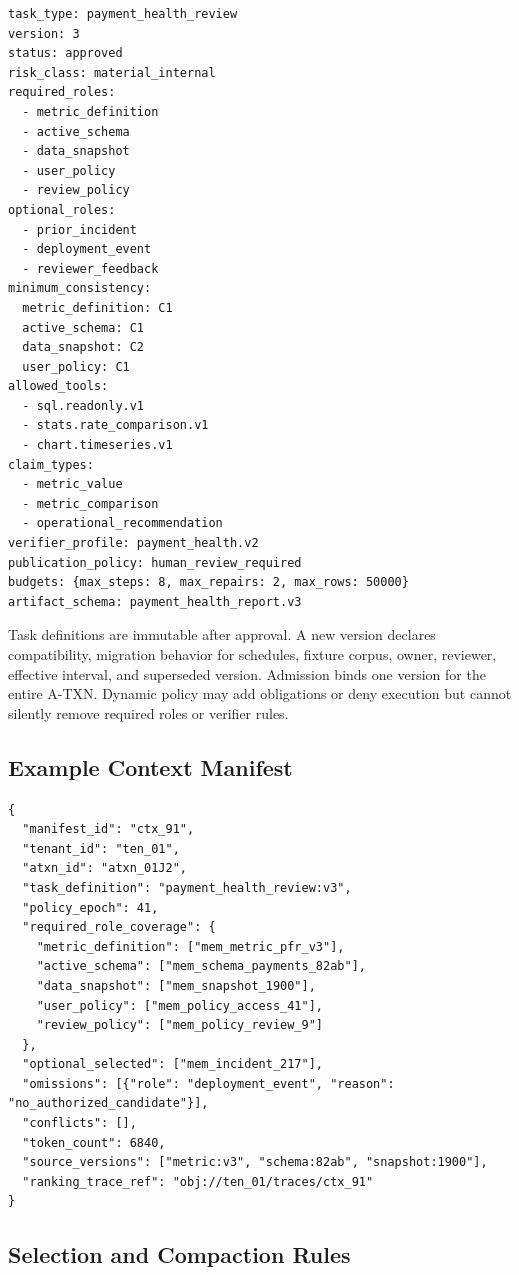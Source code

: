 \documentclass[10pt]{article}
\newcommand{\atxn}{\textsc{A-TXN}\xspace}
\begin{document}
\begin{lstlisting}[style=contract]
task_type: payment_health_review
version: 3
status: approved
risk_class: material_internal
required_roles:
  - metric_definition
  - active_schema
  - data_snapshot
  - user_policy
  - review_policy
optional_roles:
  - prior_incident
  - deployment_event
  - reviewer_feedback
minimum_consistency:
  metric_definition: C1
  active_schema: C1
  data_snapshot: C2
  user_policy: C1
allowed_tools:
  - sql.readonly.v1
  - stats.rate_comparison.v1
  - chart.timeseries.v1
claim_types:
  - metric_value
  - metric_comparison
  - operational_recommendation
verifier_profile: payment_health.v2
publication_policy: human_review_required
budgets: {max_steps: 8, max_repairs: 2, max_rows: 50000}
artifact_schema: payment_health_report.v3
\end{lstlisting}

Task definitions are immutable after approval. A new version declares compatibility, migration behavior for schedules, fixture corpus, owner, reviewer, effective interval, and superseded version. Admission binds one version for the entire \atxn. Dynamic policy may add obligations or deny execution but cannot silently remove required roles or verifier rules.

\Needspace{0.55\textheight}
\subsection{Example Context Manifest}

\begin{lstlisting}[style=contract]
{
  "manifest_id": "ctx_91",
  "tenant_id": "ten_01",
  "atxn_id": "atxn_01J2",
  "task_definition": "payment_health_review:v3",
  "policy_epoch": 41,
  "required_role_coverage": {
    "metric_definition": ["mem_metric_pfr_v3"],
    "active_schema": ["mem_schema_payments_82ab"],
    "data_snapshot": ["mem_snapshot_1900"],
    "user_policy": ["mem_policy_access_41"],
    "review_policy": ["mem_policy_review_9"]
  },
  "optional_selected": ["mem_incident_217"],
  "omissions": [{"role": "deployment_event", "reason": "no_authorized_candidate"}],
  "conflicts": [],
  "token_count": 6840,
  "source_versions": ["metric:v3", "schema:82ab", "snapshot:1900"],
  "ranking_trace_ref": "obj://ten_01/traces/ctx_91"
}
\end{lstlisting}

\subsection{Selection and Compaction Rules}
\end{document}
